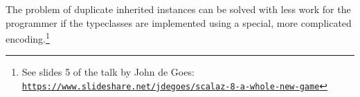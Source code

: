 The problem of duplicate inherited instances can be solved with less
work for the programmer if the typeclasses are implemented using a
special, more complicated encoding.\footnote{See slides 5 of the talk by John
de Goes: \texttt{\href{https://www.slideshare.net/jdegoes/scalaz-8-a-whole-new-game}{https://www.slideshare.net/jdegoes/scalaz-8-a-whole-new-game}}}

\begin{comment}
this tutorial is about typeclasses and type level functions to motivate
why we want to talk about this let\textsf{'}s consider what happens if we would
like to implement the sum function generically so that the same implementation
code will work for sequence of integers for sequence of doubles and
so on if we try to do that we find that it doesn't quite work we cannot
generalize the sum function like this with a type parameter T and
an argument of type sequence of T because there is no way for us to
sum or to add values of type T where T is unknown it\textsf{'}s arbitrary unknown
type obviously the sum function can only work for types T that in
some sense or summable another very similar situation happens if we
wanted for instance to define the F map function for factors that
already define the map function as we know F map is equivalent to
map so for each factor somebody defined already the map function we
would like to define F map for all of them at once by in the same
generic code but we cannot generalize F map to arbitrary type constructors
F here is what we would have to write suppose that we tried we would
have to put F as a type parameter F being the type constructor of
the function just as an aside in Scala this syntax is necessary if
you want to put a type parameter that is itself a type construction
you can do that just by using this syntax so if we try to write F
map like this we will have F me up with type parameters and we cannot
write this code because F in here is an arbitrary type constructor
parameter and there\textsf{'}s no way for us to get the map function for that
F we don't even know if it exists just like here there\textsf{'}s no way for
us to get the addition operation with some more plus or something
for the type T and just like in that case the F map could work only
for certain type constructors F namely for those that are factors
so our desire to write code more generically leads us to the need
to define functions whose type arguments for example the T and F are
not just arbitrary types but there are types that are required to
have certain properties or to belong to a certain subset of possible

\end{comment}
